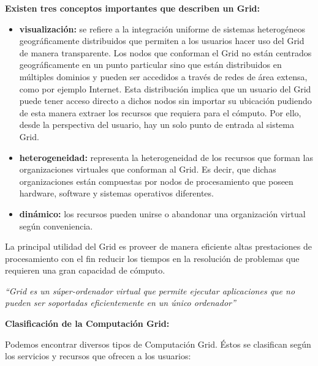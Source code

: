 \textbf{Existen tres conceptos importantes que describen un Grid:}

\begin{itemize}
\item \textbf{visualización:} se refiere a la integración uniforme de sistemas heterogéneos geográficamente distribuidos que permiten a los usuarios hacer uso del Grid de manera transparente. Los nodos que conforman el Grid no están centrados geográficamente en un punto 	particular sino que están distribuidos en múltiples dominios y pueden ser accedidos a través de redes de área extensa, como por ejemplo Internet. Esta distribución implica que un usuario del Grid puede tener acceso directo a dichos nodos sin importar su ubicación pudiendo de esta manera extraer los recursos que requiera para el cómputo. Por ello, desde la perspectiva del usuario, hay un solo punto de entrada al sistema Grid.
\item \textbf{heterogeneidad:} representa la heterogeneidad de los recursos que forman las organizaciones virtuales que conforman al Grid. Es decir, que dichas organizaciones están compuestas por nodos de procesamiento que poseen hardware, software y sistemas operativos diferentes.
\item \textbf{dinámico:} los recursos pueden unirse o abandonar una organización virtual según conveniencia.
\end{itemize}

La principal utilidad del Grid es proveer de manera eficiente altas prestaciones de procesamiento con el fin reducir los tiempos en la resolución de problemas que requieren una gran capacidad de cómputo.

\begin{center}
\textit{“Grid es un súper-ordenador virtual que permite ejecutar aplicaciones que no pueden ser soportadas eficientemente en un único ordenador”}
\end{center}

\textbf{Clasificación de la Computación Grid:}

Podemos encontrar diversos tipos de Computación Grid. Éstos se clasifican según los servicios y recursos que ofrecen a los usuarios:

